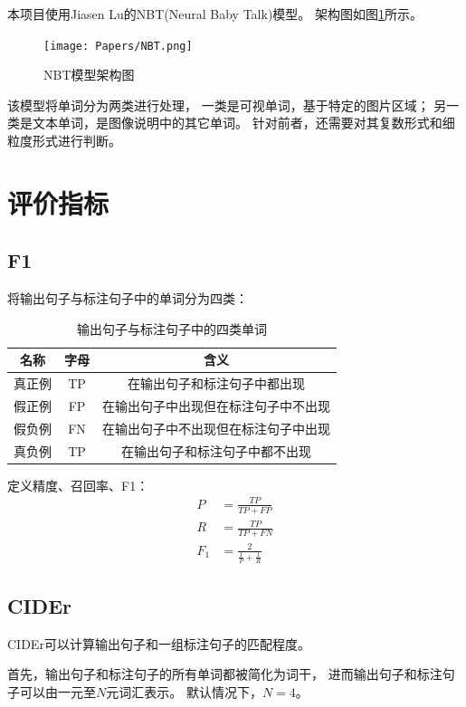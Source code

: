 \documentclass[12pt]{article}
\begin{document}
本项目使用Jiasen Lu的NBT(Neural Baby Talk)模型。
架构图如图\ref{fig:struct}所示。

\begin{figure}[h]
	\centering
	\texttt{[image: Papers/NBT.png]}
	\caption{NBT模型架构图}
	\label{fig:struct}
\end{figure}

该模型将单词分为两类进行处理，
一类是可视单词，基于特定的图片区域；
另一类是文本单词，是图像说明中的其它单词。
针对前者，还需要对其复数形式和细粒度形式进行判断。

\section{评价指标}

\subsection{F1}
\label{sec:F1}

将输出句子与标注句子中的单词分为四类：

\begin{table}[h]
	\centering
	\begin{tabular}{ccc}
		\hline
		名称 & 字母 & 含义 \\
		\hline
		真正例 & TP & 在输出句子和标注句子中都出现 \\
		假正例 & FP & 在输出句子中出现但在标注句子中不出现 \\
		假负例 & FN & 在输出句子中不出现但在标注句子中出现 \\
		真负例 & TP & 在输出句子和标注句子中都不出现 \\
		\hline
	\end{tabular}
	\caption{输出句子与标注句子中的四类单词}
\end{table}

定义精度、召回率、F1：
\begin{align*}
	P &= \frac{TP}{TP + FP} \\ 
	R &= \frac{TP}{TP + FN} \\ 
	F_1 &= \frac{2}{\frac{1}{P} + \frac{1}{R}} 
\end{align*}

\subsection{CIDEr}

CIDEr可以计算输出句子和一组标注句子的匹配程度。

首先，输出句子和标注句子的所有单词都被简化为词干，
进而输出句子和标注句子可以由一元至$N$元词汇表示。
默认情况下，$N=4$。
\end{document}
